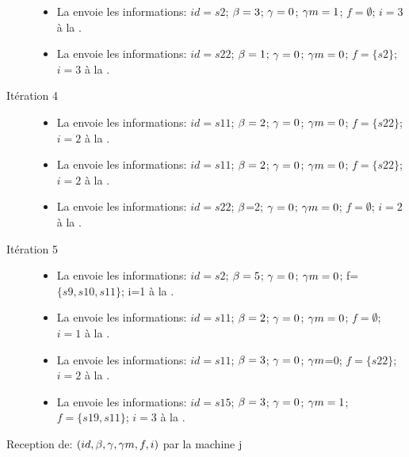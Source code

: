 \begin{Exemple}
\begin{description}
\begin{itemize}
			\item  La \mtree{} envoie les informations: $id =s2$; $\beta{}=3$; $\gamma{}=0$; $\gamma m{}=1$; $f =\emptyset$; $i=3$ à la \mone{}.
			\item  La \mtree{} envoie les informations: $id =s22$; $\beta{}=1$; $\gamma{}=0$; $\gamma m{}=0$; $f =\{s2\}$; $i=3$ à la \mtwo{}.
			\end{itemize}
		\item[Itération 4]
		\begin{itemize}
			\item  La \mtwo{} envoie les informations: $id =s11$; $\beta{}=2$; $\gamma{}=0$; $\gamma m{}=0$; $f=\{s22\}$; $i=2$ à la \mone{}.
			\item  La \mtwo{} envoie les informations: $id =s11$; $\beta{}=2$; $\gamma{}=0$; $\gamma m{}=0$; $f=\{s22\}$; $i=2$ à la \mtree{}.
			\item  La \mtwo{} envoie les informations: $id =s22$; $\beta{}$=2; $\gamma{}=0$; $\gamma m{}=0$; $f=\emptyset$; $i=2$ à la \mtwo{}.
			\end{itemize}
			\item[Itération 5]
		\begin{itemize}
		\item  La \mone{} envoie les informations: $id =s2$; $\beta{}=5$; $\gamma{}=0$; $\gamma m{}=0$; f=$\{s9,s10,s11\}$; i=1 à la \mtree{}.
			\item  La \mone{} envoie les informations: $id =s11$; $\beta{}=2$; $\gamma{}=0$; $\gamma m{}=0$; $f=\emptyset$; $i=1$ à la \mtwo{}.
			\item  La \mtree{} envoie les informations: $id =s11$; $\beta{}=3$; $\gamma{}=0$; $\gamma m{}$=0; $f =\{s22\}$; $i=2$ à la \mtwo{}.
			\item La \mtree{} envoie les informations: $id =s15$; $\beta{}=3$; $\gamma{}=0$; $\gamma m{}=1$; $f=\{s19,s11\}$; $i=3$	 à la \mtwo{}.
			\end{itemize}	
	\end{description}

\end{Exemple}

\begin{procedure}
\setcounter{AlgoLine}{0}	
\SetAlgoLined
\LinesNumbered
  \caption{Reception de: $(id,\beta{},\gamma{},\gamma m{},f,i)$ par la machine j}
\end{procedure}


